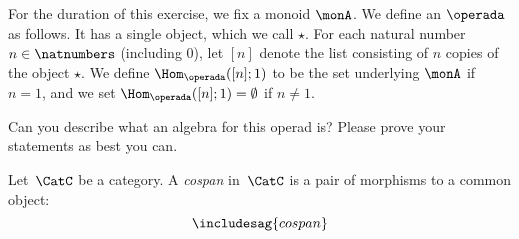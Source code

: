 \begin{gradedexercise}\label{ex:MonoidsActionsAsAlgebras}
For the duration of this exercise, we fix a monoid $\monA$. 
We define an $\operada$ as follows. It has a single object, which we call $\star$.  For each natural number $n \in \natnumbers$ (including $0$), let $[n]$ denote the list consisting of $n$ copies of the object $\star$. We define $\Hom_\operada([n];1)$ to be the set underlying $\monA$ if $n =1$, and we set $\Hom_\operada([n];1) = \emptyset$ if $n \neq 1$. 

Can you describe what an algebra for this operad is?  Please prove your statements as best you can. 
\end{gradedexercise}






\begin{definition}
  \label{def:cospan}
  Let~$\CatC$ be a category. A \emph{cospan} in~$\CatC$ is a pair of morphisms to a common object:
  \begin{equation}
    \includesag{cospan}
  \end{equation}
\end{definition}




\devel{
\begin{forslides}
  \begin{equation*}
\label{eq:composition_operad}
    [\mora,\morb]\mthen \morc
\end{equation*}
\end{forslides}

}

